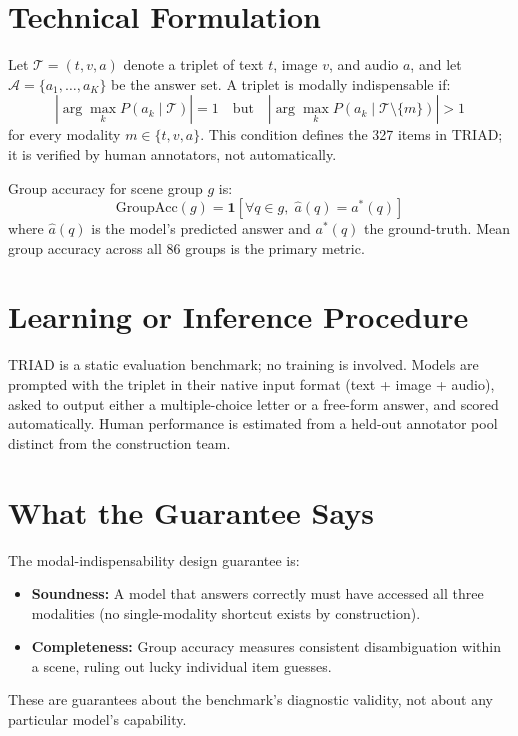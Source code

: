 \documentclass[10pt,twocolumn]{article}
\begin{document}
\section{Technical Formulation}

Let $\mathcal{T} = (t, v, a)$ denote a triplet of text $t$, image $v$,
and audio $a$, and let $\mathcal{A} = \{a_1, \ldots, a_K\}$ be the
answer set. A triplet is modally indispensable if:
\[
|\arg\max_k P(a_k \mid \mathcal{T})| = 1
\quad\text{but}\quad
|\arg\max_k P(a_k \mid \mathcal{T} \setminus \{m\})| > 1
\]
for every modality $m \in \{t, v, a\}$. This condition defines the 327
items in TRIAD; it is verified by human annotators, not automatically.

Group accuracy for scene group $g$ is:
\[
\text{GroupAcc}(g) = \mathbf{1}\!\left[\forall q \in g,\;
  \hat{a}(q) = a^*(q)\right]
\]
where $\hat{a}(q)$ is the model's predicted answer and $a^*(q)$ the
ground-truth. Mean group accuracy across all 86 groups is the primary
metric.

\section{Learning or Inference Procedure}

TRIAD is a static evaluation benchmark; no training is involved.
Models are prompted with the triplet in their native input format
(text + image + audio), asked to output either a multiple-choice
letter or a free-form answer, and scored automatically. Human
performance is estimated from a held-out annotator pool distinct
from the construction team.

\section{What the Guarantee Says}

The modal-indispensability design guarantee is:
\begin{itemize}[itemsep=2pt,parsep=0pt]
  \item \textbf{Soundness:} A model that answers correctly must have
    accessed all three modalities (no single-modality shortcut exists
    by construction).
  \item \textbf{Completeness:} Group accuracy measures consistent
    disambiguation within a scene, ruling out lucky individual item
    guesses.
\end{itemize}
These are guarantees about the benchmark's diagnostic validity, not
about any particular model's capability.
\end{document}
